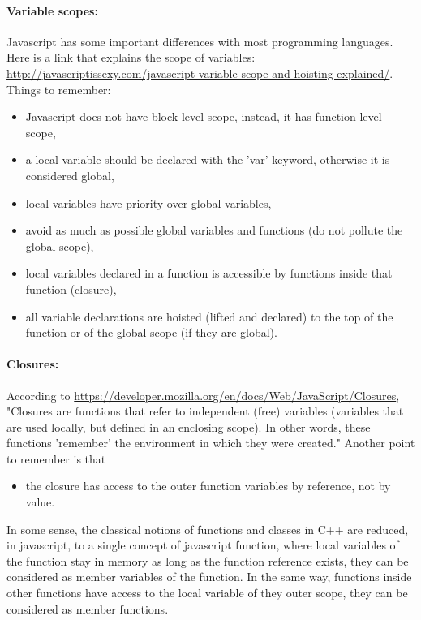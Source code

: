 \paragraph{Variable scopes:}
Javascript has some important differences with most programming languages.
Here is a link that explains the scope of variables: 
\url{http://javascriptissexy.com/javascript-variable-scope-and-hoisting-explained/}.
Things to remember:
\begin{itemize}
 \item Javascript does not have block-level scope, instead, it has function-level scope,
 \item a local variable should be declared with the 'var' keyword, otherwise it is considered global,
 \item local variables have priority over global variables,
 \item avoid as much as possible global variables and functions (do not pollute the global scope),
 \item local variables declared in a function is accessible by functions inside that function (closure),
 \item all variable declarations are hoisted (lifted and declared) to the top of the function or of the
       global scope (if they are global).
\end{itemize}

\paragraph{Closures:}
According to \url{https://developer.mozilla.org/en/docs/Web/JavaScript/Closures},
"Closures are functions that refer to independent (free) variables (variables 
that are used locally, but defined in an enclosing scope). 
In other words, these functions 'remember' the environment in which they were created."
Another point to remember is that
\begin{itemize}
 \item the closure has access to the outer function variables by reference, not by value.
\end{itemize}

In some sense, the classical notions of functions and classes in C++ are reduced,
in javascript, to a single concept of javascript function, where local variables
of the function stay in memory as long as the function reference exists, they 
can be considered as member variables of the function. In the same way, functions inside
other functions have access to the local variable of they outer scope, they 
can be considered as member functions.


